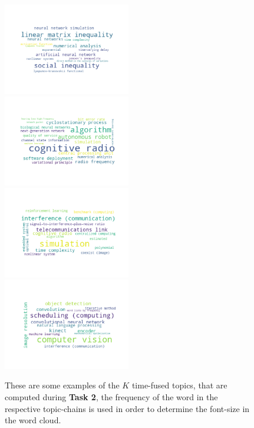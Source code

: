 \begin{figure}[h!]	
	\includegraphics[width=0.495\textwidth]{img/topic1.png}
	\includegraphics[width=0.495\textwidth]{img/topic2.png}\\
	\includegraphics[width=0.495\textwidth]{img/topic3.png}
	\includegraphics[width=0.495\textwidth]{img/topic4.png}
	\caption{These are some examples of the $K$ time-fused topics, that are computed during \textbf{Task 2}, the frequency of the word in the respective topic-chains is used in order to determine the font-size in the word cloud.}\label{fig:fusedtopics}
\end{figure}

\newpage

